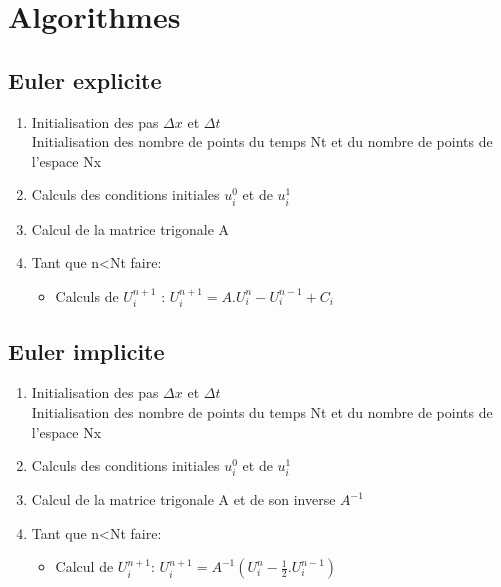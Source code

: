 \section{Algorithmes}
\subsection{Euler explicite}

\begin{enumerate}
    \item Initialisation des pas $\Delta x$ et $\Delta t$\\
    Initialisation des nombre de points du temps Nt et du nombre de points de l'espace Nx
    
    \item Calculs des conditions initiales $u^0_i$ et de $u^1_i$
    
    \item Calcul de la matrice trigonale A
    
    \item Tant que n<Nt faire:
        \begin{itemize}
        \item Calculs de $U^{n+1}_i$ : $U^{n+1}_i = A.U^{n}_i - U^{n-1}_i + C_i$\\
        \end{itemize}
    
\end{enumerate}

\subsection{Euler implicite}
\begin{enumerate}
    \item Initialisation des pas $\Delta x$ et $\Delta t$\\
    Initialisation des nombre de points du temps Nt et du nombre de points de l'espace Nx
    
    \item Calculs des conditions initiales $u^0_i$ et de $u^1_i$
    
    \item Calcul de la matrice trigonale A et de son inverse $A^{-1}$
    
    \item Tant que n<Nt faire:\\
        \begin{itemize}
            \item Calcul de $U^{n+1}_i$: $U^{n+1}_i = A^{-1}(U^{n}_i - \frac{1}{2}.U^{n-1}_i)$
        \end{itemize}
    
\end{enumerate}

